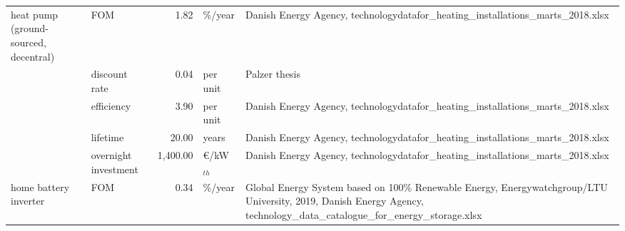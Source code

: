 \begin{longtable}{p{4cm}p{4cm}rp{3cm}p{10cm}}
heat pump (ground-sourced, decentral) & FOM &         1.82 &                       \%/year &                                                                                                                                                                                                                                                    Danish Energy Agency, technologydatafor\_heating\_installations\_marts\_2018.xlsx \\
                      & discount rate &         0.04 &                      per unit &                                                                                                                                                                                                                                                                                                                        Palzer thesis \\
                      & efficiency &         3.90 &                      per unit &                                                                                                                                                                                                                                                    Danish Energy Agency, technologydatafor\_heating\_installations\_marts\_2018.xlsx \\
                      & lifetime &        20.00 &                         years &                                                                                                                                                                                                                                                    Danish Energy Agency, technologydatafor\_heating\_installations\_marts\_2018.xlsx \\
                      & overnight investment &     1,400.00 &               \euro/kW$_{th}$ &                                                                                                                                                                                                                                                    Danish Energy Agency, technologydatafor\_heating\_installations\_marts\_2018.xlsx \\
home battery inverter & FOM &         0.34 &                       \%/year &                                                                                                                                                            Global Energy System based on 100\% Renewable Energy, Energywatchgroup/LTU University, 2019, Danish Energy Agency, technology\_data\_catalogue\_for\_energy\_storage.xlsx \\

\end{longtable}

